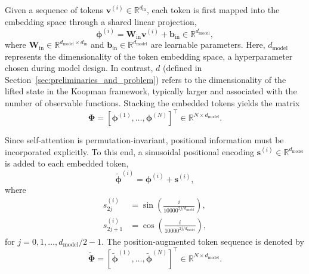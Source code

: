 \documentclass[journal]{IEEEtran}
\newcommand{\vs}{\mathbf{s}}
\newcommand{\vb}{\mathbf{b}}
\newcommand{\vphi}{\boldsymbol{\phi}}
\newcommand{\mW}{\mathbf{W}}
\newcommand{\mPhi}{\boldsymbol{\Phi}}
\begin{document}
Given a sequence of tokens $\mathbf{v}^{(i)} \in \mathbb{R}^{d_{\mathrm{in}}}$, each token is first mapped into the embedding space through a shared linear projection, 
\begin{equation}
    \vphi^{(i)} = \mW_{\mathrm{in}} \mathbf{v}^{(i)} + \vb_{\mathrm{in}} \in \mathbb{R}^{d_{\mathrm{model}}},
    \label{eq:general_embed}
\end{equation}
where $\mW_{\mathrm{in}} \in \mathbb{R}^{d_{\mathrm{model}} \times d_{\mathrm{in}}}$ and $\vb_{\mathrm{in}} \in \mathbb{R}^{d_{\mathrm{model}}}$ are learnable parameters. Here, $d_{\mathrm{model}}$ represents the dimensionality of the token embedding space, a hyperparameter chosen during model design. In contrast, $d$ (defined in Section~\ref{sec:preliminaries_and_problem}) refers to the dimensionality of the lifted state in the Koopman framework, typically larger and associated with the number of observable functions. Stacking the embedded tokens yields the matrix
\begin{equation}
    \mPhi = [\vphi^{(1)}, \ldots, \vphi^{(N)}]^\top
    \in \mathbb{R}^{N \times d_{\mathrm{model}}}.
\end{equation}

Since self-attention is permutation-invariant, positional information must be incorporated explicitly. To this end, a sinusoidal positional encoding $\vs^{(i)} \in \mathbb{R}^{d_{\mathrm{model}}}$ is added to each embedded token,
\begin{equation}
    \tilde{\vphi}^{(i)} = \vphi^{(i)} + \vs^{(i)},
\end{equation}
where
\begin{equation}
\begin{split}
    s^{(i)}_{2j} &= \sin\!\left(\frac{i}{10000^{2j/d_{\mathrm{model}}}}\right), \\
    s^{(i)}_{2j+1} &= \cos\!\left(\frac{i}{10000^{2j/d_{\mathrm{model}}}}\right),
\end{split}
\label{eq:pos_enc}
\end{equation}
for $j = 0,1,\ldots,d_{\mathrm{model}}/2-1$. The position-augmented token sequence is denoted by
\begin{equation}
    \widetilde{\mPhi}
    =
    [\tilde{\vphi}^{(1)}, \ldots, \tilde{\vphi}^{(N)}]^\top
    \in \mathbb{R}^{N \times d_{\mathrm{model}}}.
\end{equation}
\end{document}
